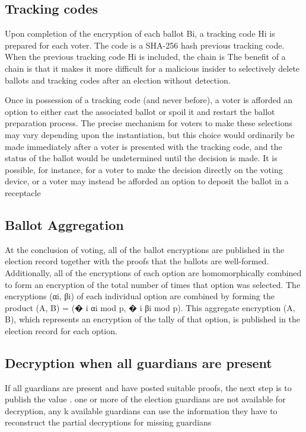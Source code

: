 \subsection{Tracking codes}
Upon completion of the encryption of each ballot Bi, a tracking code Hi is prepared for each voter. The code is a
SHA-256 hash
\cite[17]{eg-spec}
previous tracking code. When the previous tracking code Hi is included, the chain is
The benefit of a chain is that it makes it more difficult for a malicious insider to selectively delete ballots and
tracking codes after an election without detection.
\cite[17]{eg-spec}

Once in possession of a tracking code (and never before), a voter is afforded an option to either cast the associated
ballot or spoil it and restart the ballot preparation process. The precise mechanism for voters to make these selections
may vary depending upon the instantiation, but this choice would ordinarily be made immediately after a voter is
presented with the tracking code, and the status of the ballot would be undetermined until the decision is made. It is
possible, for instance, for a voter to make the decision directly on the voting device, or a voter may instead be
afforded an option to deposit the ballot in a receptacle
\cite[17]{eg-spec}

\subsection{Ballot Aggregation}
At the conclusion of voting, all of the ballot encryptions are published in the election record together with the proofs
that the ballots are well-formed. Additionally, all of the encryptions of each option are homomorphically combined to
form an encryption of the total number of times that option was selected. The encryptions (αi, βi) of each individual
option are combined by forming the product (A, B) = (� i αi mod p, � i βi mod p). This aggregate encryption (A, B),
which represents an encryption of the tally of that option, is published in the election record for each option.
\cite[18]{eg-spec}

\subsection{Decryption when all guardians are present}
If all guardians are present and have posted suitable proofs, the next step is to publish the value
\cite[19]{eg-spec}.
one or more of the election guardians are not available for decryption, any k available guardians can use the
information they have to reconstruct the partial decryptions for missing guardians
\cite[19]{eg-spec}

